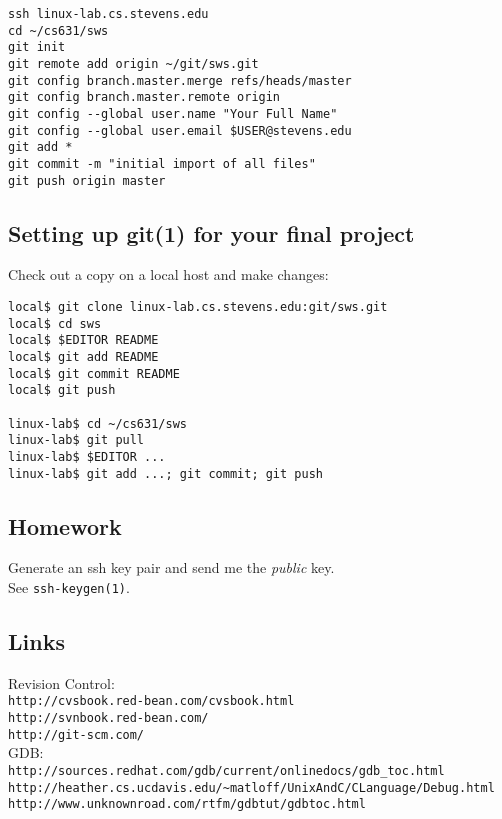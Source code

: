 \documentclass[xga]{xdvislides}
\begin{document}
\begin{verbatim}
ssh linux-lab.cs.stevens.edu
cd ~/cs631/sws
git init
git remote add origin ~/git/sws.git
git config branch.master.merge refs/heads/master
git config branch.master.remote origin
git config --global user.name "Your Full Name"
git config --global user.email $USER@stevens.edu
git add *
git commit -m "initial import of all files"
git push origin master
\end{verbatim}

\subsection{Setting up git(1) for your final project}
Check out a copy on a local host and make changes:
\\

\begin{verbatim}
local$ git clone linux-lab.cs.stevens.edu:git/sws.git
local$ cd sws
local$ $EDITOR README
local$ git add README
local$ git commit README
local$ git push

linux-lab$ cd ~/cs631/sws
linux-lab$ git pull
linux-lab$ $EDITOR ...
linux-lab$ git add ...; git commit; git push
\end{verbatim}

\subsection{Homework}
Generate an ssh key pair and send me the {\em public} key. \\
See {\tt ssh-keygen(1)}.

\subsection{Links}
Revision Control: \\
{\tt http://cvsbook.red-bean.com/cvsbook.html} \\

{\tt http://svnbook.red-bean.com/} \\

{\tt http://git-scm.com/} \\

GDB: \\
{\tt http://sources.redhat.com/gdb/current/onlinedocs/gdb\_toc.html} \\

\verb+http://heather.cs.ucdavis.edu/~matloff/UnixAndC/CLanguage/Debug.html+ \\

{\tt http://www.unknownroad.com/rtfm/gdbtut/gdbtoc.html}
\end{document}
